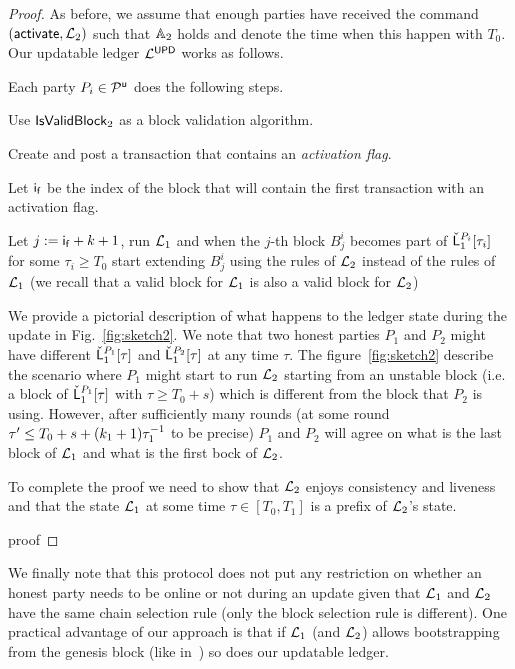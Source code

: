 \begin{proof}
As before, we assume that enough parties have received the command $(\mathsf{activate}, \mathcal{L}_2)$ such that
$\mathbb{A}_2$ holds and denote the time when this happen with $T_0$.
Our updatable ledger $\mathcal{L}^\mathsf{UPD}$ works as follows.

Each party $P_i\in\mathcal{P}^\mathsf{u}$ does the following steps.
\begin{myenumerate}
	\item Use $\mathsf{IsValidBlock}_2$ as a block validation algorithm.
	\item Create and post a transaction that contains an \emph{activation flag}. 
	\item Let $\mathsf{i_f}$ be the index of the block that will contain the first transaction with an activation flag.
	\item Let $j:=\mathsf{i_f}+k+1$, run $\mathcal{L}_1$ and when the $j$-th block $B^i_j$ becomes part of $\check {\mathsf{L}}_1^{P_i}[\tau_i]$ for some $\tau_i \geq T_0$ start extending $B^i_{j}$ using the rules of $\mathcal{L}_2$ instead of the rules of $\mathcal{L}_1$ (we recall that a valid block for $\mathcal{L}_1$ is also a valid block for $\mathcal{L}_2$)
\end{myenumerate}


We provide a pictorial description of what happens to the ledger state during the update in Fig.~\ref{fig:sketch2}.
We note that two honest parties $P_1$ and $P_2$ might have different $\check {\mathsf{L}}_1^{P_1}[\tau]$ and  $\check {\mathsf{L}}_1^{P_2}[\tau]$ at any time $\tau$. The figure~\ref{fig:sketch2}
describe the scenario where $P_1$ might start to run $\mathcal{L}_2$ starting from an 
unstable block (i.e. a block of  $\check {\mathsf{L}}_1^{P_1}[\tau]$ with $\tau\geq
T_0+s$) which is different from the block that $P_2$ is using. However, after sufficiently many
 rounds (at some round  $\tau'\leq T_0+s+(k_1+1)\tau_1^{-1}$ to be precise) $P_1$ and $P_2$ will agree on what is the last block of $\mathcal{L}_1$ and what is the first bock of $\mathcal{L}_2$.

 

To complete the proof we need to show that $\mathcal{L}_2$ enjoys consistency and liveness
and that the state $\mathcal{L}_1$ at some time $\tau\in [T_0,T_1]$ is a prefix of $\mathcal{L}_2$'s state. 


{proof}

\end{proof}



We finally note that this protocol does not put any restriction on whether an honest party needs to be online or not during an update given that $\mathcal{L}_1$ and $\mathcal{L}_2$ have the same chain selection rule (only the block selection rule is different).
One practical advantage of our approach is that if $\mathcal{L}_1$ (and $\mathcal{L}_2$) allows bootstrapping from the genesis block (like in~\cite{CCS:BGKRZ18}) so does our updatable ledger.




